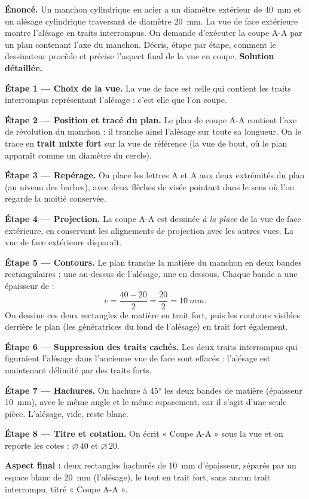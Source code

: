 \documentclass[11pt]{article}
\begin{document}
\begin{exoresolu}
\textbf{Énoncé.} Un manchon cylindrique en acier a un diamètre extérieur de \SI{40}{mm} et un alésage cylindrique traversant de diamètre \SI{20}{mm}. La vue de face extérieure montre l'alésage en traits interrompus. On demande d'exécuter la coupe A-A par un plan contenant l'axe du manchon. Décris, étape par étape, comment le dessinateur procède et précise l'aspect final de la vue en coupe.
\tcblower
\textbf{Solution détaillée.}

\textbf{Étape 1 — Choix de la vue.} La vue de face est celle qui contient les traits interrompus représentant l'alésage : c'est elle que l'on coupe.

\textbf{Étape 2 — Position et tracé du plan.} Le plan de coupe A-A contient l'axe de révolution du manchon : il tranche ainsi l'alésage sur toute sa longueur. On le trace en \textbf{trait mixte fort} sur la vue de référence (la vue de bout, où le plan apparaît comme un diamètre du cercle).

\textbf{Étape 3 — Repérage.} On place les lettres A et A aux deux extrémités du plan (au niveau des barbes), avec deux flèches de visée pointant dans le sens où l'on regarde la moitié conservée.

\textbf{Étape 4 — Projection.} La coupe A-A est dessinée \emph{à la place} de la vue de face extérieure, en conservant les alignements de projection avec les autres vues. La vue de face extérieure disparaît.

\textbf{Étape 5 — Contours.} Le plan tranche la matière du manchon en deux bandes rectangulaires : une au-dessus de l'alésage, une en dessous. Chaque bande a une épaisseur de :
\[
e=\frac{40-20}{2}=\frac{20}{2}=\SI{10}{mm}.
\]
On dessine ces deux rectangles de matière en trait fort, puis les contours visibles derrière le plan (les génératrices du fond de l'alésage) en trait fort également.

\textbf{Étape 6 — Suppression des traits cachés.} Les deux traits interrompus qui figuraient l'alésage dans l'ancienne vue de face sont effacés : l'alésage est maintenant délimité par des traits forts.

\textbf{Étape 7 — Hachures.} On hachure à 45° les deux bandes de matière (épaisseur \SI{10}{mm}), avec le même angle et le même espacement, car il s'agit d'une seule pièce. L'alésage, vide, reste blanc.

\textbf{Étape 8 — Titre et cotation.} On écrit « Coupe A-A » sous la vue et on reporte les cotes : $\varnothing\,40$ et $\varnothing\,20$.

\textbf{Aspect final :} deux rectangles hachurés de \SI{10}{mm} d'épaisseur, séparés par un espace blanc de \SI{20}{mm} (l'alésage), le tout en trait fort, sans aucun trait interrompu, titré « Coupe A-A ».
\end{exoresolu}
\end{document}
